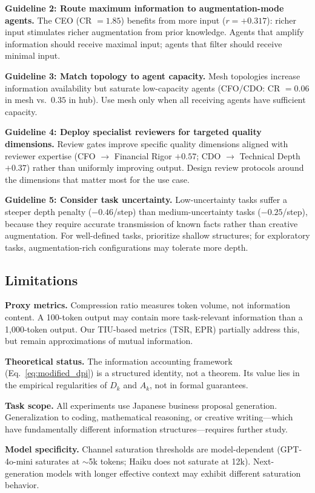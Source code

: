 \documentclass[conference]{IEEEtran}
\begin{document}
\textbf{Guideline 2: Route maximum information to augmentation-mode agents.}
The CEO (CR $= 1.85$) benefits from more input ($r = +0.317$): richer input stimulates richer augmentation from prior knowledge.
Agents that amplify information should receive maximal input; agents that filter should receive minimal input.

\textbf{Guideline 3: Match topology to agent capacity.}
Mesh topologies increase information availability but saturate low-capacity agents (CFO/CDO: CR $= 0.06$ in mesh vs.\ $0.35$ in hub).
Use mesh only when all receiving agents have sufficient capacity.

\textbf{Guideline 4: Deploy specialist reviewers for targeted quality dimensions.}
Review gates improve specific quality dimensions aligned with reviewer expertise (CFO $\to$ Financial Rigor $+0.57$; CDO $\to$ Technical Depth $+0.37$) rather than uniformly improving output.
Design review protocols around the dimensions that matter most for the use case.

\textbf{Guideline 5: Consider task uncertainty.}
Low-uncertainty tasks suffer a steeper depth penalty ($-0.46$/step) than medium-uncertainty tasks ($-0.25$/step), because they require accurate transmission of known facts rather than creative augmentation.
For well-defined tasks, prioritize shallow structures; for exploratory tasks, augmentation-rich configurations may tolerate more depth.

\subsection{Limitations}

\textbf{Proxy metrics.}
Compression ratio measures token volume, not information content.
A 100-token output may contain more task-relevant information than a 1,000-token output.
Our TIU-based metrics (TSR, EPR) partially address this, but remain approximations of mutual information.

\textbf{Theoretical status.}
The information accounting framework (Eq.~\ref{eq:modified_dpi}) is a structured identity, not a theorem.
Its value lies in the empirical regularities of $D_k$ and $A_k$, not in formal guarantees.

\textbf{Task scope.}
All experiments use Japanese business proposal generation.
Generalization to coding, mathematical reasoning, or creative writing---which have fundamentally different information structures---requires further study.

\textbf{Model specificity.}
Channel saturation thresholds are model-dependent (GPT-4o-mini saturates at $\sim$5k tokens; Haiku does not saturate at 12k).
Next-generation models with longer effective context may exhibit different saturation behavior.
\end{document}
